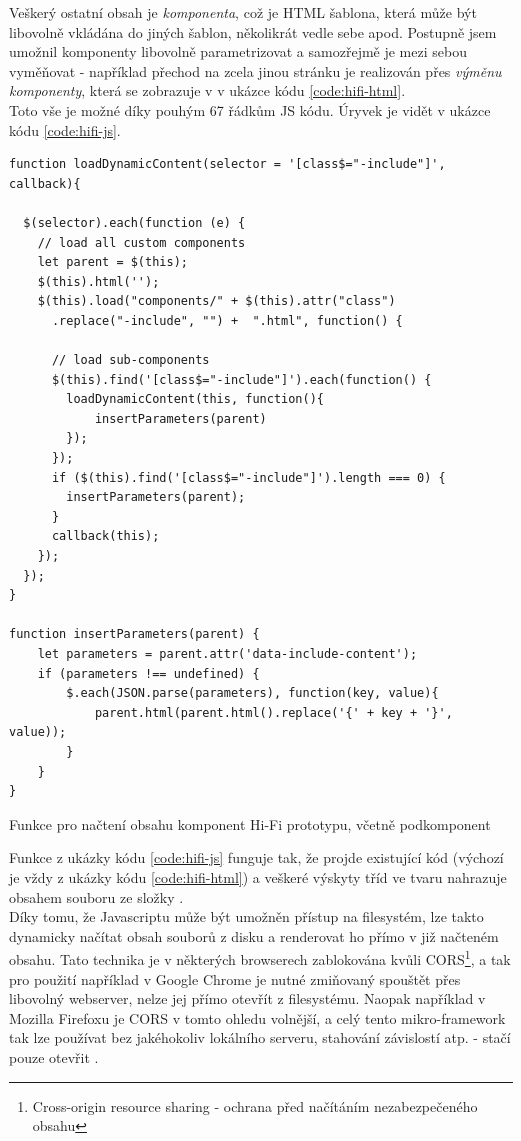 Veškerý ostatní obsah je \emph{komponenta}, což je HTML šablona, která může být libovolně vkládána do jiných šablon, několikrát vedle sebe apod. Postupně jsem umožnil komponenty libovolně parametrizovat a samozřejmě je mezi sebou vyměňovat - například přechod na zcela jinou stránku je realizován přes \emph{výměnu komponenty}, která se zobrazuje v  v ukázce kódu \ref{code:hifi-html}.\\
Toto vše je možné díky pouhým 67 řádkům JS kódu. Úryvek je vidět v ukázce kódu \ref{code:hifi-js}.

\begin{listing}[H]
\begin{verbatim}
function loadDynamicContent(selector = '[class$="-include"]', callback){

  $(selector).each(function (e) {
    // load all custom components
    let parent = $(this);
    $(this).html('');
    $(this).load("components/" + $(this).attr("class")
      .replace("-include", "") +  ".html", function() {

      // load sub-components
      $(this).find('[class$="-include"]').each(function() {
        loadDynamicContent(this, function(){
            insertParameters(parent)
        });
      });
      if ($(this).find('[class$="-include"]').length === 0) {
        insertParameters(parent);
      }
      callback(this);
    });
  });
}

function insertParameters(parent) {
    let parameters = parent.attr('data-include-content');
    if (parameters !== undefined) {
        $.each(JSON.parse(parameters), function(key, value){
            parent.html(parent.html().replace('{' + key + '}', value));
        }
    }
}
\end{verbatim}
\caption[Funkce pro načtení obsahu komponent Hi-Fi prototypu]{Funkce pro načtení obsahu komponent Hi-Fi prototypu, včetně podkomponent} \label{code:hifi-js}
\end{listing}

Funkce  z ukázky kódu \ref{code:hifi-js} funguje tak, že projde existující kód (výchozí je vždy  z ukázky kódu \ref{code:hifi-html}) a veškeré výskyty tříd ve tvaru  nahrazuje obsahem souboru  ze složky .\\
Díky tomu, že Javascriptu může být umožněn přístup na filesystém, lze takto dynamicky načítat obsah souborů z disku a renderovat ho přímo v již načteném obsahu. Tato technika je v některých browserech zablokována kvůli CORS\footnote{Cross-origin resource sharing - ochrana před načítáním nezabezpečeného obsahu}, a tak pro použití například v Google Chrome je nutné zmiňovaný  spouštět přes libovolný webserver, nelze jej přímo otevřít z filesystému. Naopak například v Mozilla Firefoxu je CORS v tomto ohledu volnější, a celý tento mikro-framework tak lze používat bez jakéhokoliv lokálního serveru, stahování závislostí atp. - stačí pouze otevřit .\\

